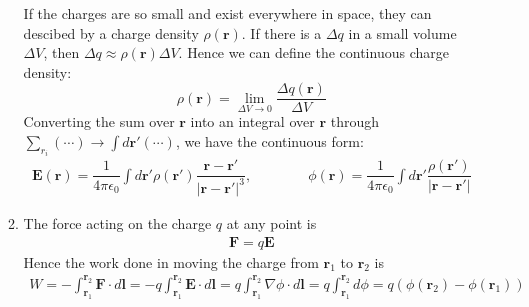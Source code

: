 \documentclass[a4paper,11pt]{article}
\begin{document}
\begin{enumerate}
\begin{enumerate}
        If the charges are so small and exist everywhere in space, they can descibed by a charge density $\rho(\boldsymbol{r})$. If there is a $\Delta q$ in a small volume $\Delta V$, then $\Delta q \approx \rho(\boldsymbol{r}) \Delta V$. Hence we can define the continuous charge density:
        \begin{equation}
            \rho(\boldsymbol{r})=\lim\limits_{\Delta V\to 0}\dfrac{\Delta q(\boldsymbol{r})}{\Delta V}
        \end{equation}
        Converting the sum over $\boldsymbol{r}$ into an integral over $\boldsymbol{r}$ through $\sum\limits_{r_i}(\dotsm)\to\int d\boldsymbol{r}'(\dotsm)$, we have the continuous form:
        \begin{eqnarray}
            \boldsymbol{E}(\boldsymbol{r})=\dfrac{1}{4\pi\epsilon_0}\int d\boldsymbol{r}'\rho(\boldsymbol{r}')\dfrac{\boldsymbol{r}-\boldsymbol{r}'}{|\boldsymbol{r}-\boldsymbol{r}'|^3},\quad\quad\quad\quad \phi(\boldsymbol{r})=\dfrac{1}{4\pi\epsilon_0}\int d\boldsymbol{r}'\dfrac{\rho(\boldsymbol{r}')}{|\boldsymbol{r}-\boldsymbol{r}'|}
        \end{eqnarray}
        \item The force acting on the charge $q$ at any point is 
        \begin{eqnarray}
            \boldsymbol{F}=q\boldsymbol{E}
        \end{eqnarray}
        Hence the work done in moving the charge from $\boldsymbol{r}_1$ to $\boldsymbol{r}_2$ is
        \begin{eqnarray}
            W=-\int_{\boldsymbol{r}_1}^{\boldsymbol{r}_2}\boldsymbol{F}\cdot d\boldsymbol{l} = -q\int_{\boldsymbol{r}_1}^{\boldsymbol{r}_2}\boldsymbol{E}\cdot d\boldsymbol{l}=q\int_{\boldsymbol{r}_1}^{\boldsymbol{r}_2}\nabla\phi\cdot d\boldsymbol{l}=q\int_{\boldsymbol{r}_1}^{\boldsymbol{r}_2}d\phi=q(\phi(\boldsymbol{r}_2)-\phi(\boldsymbol{r}_1))
        \end{eqnarray}
        

\end{enumerate}
\end{enumerate}
\end{document}
